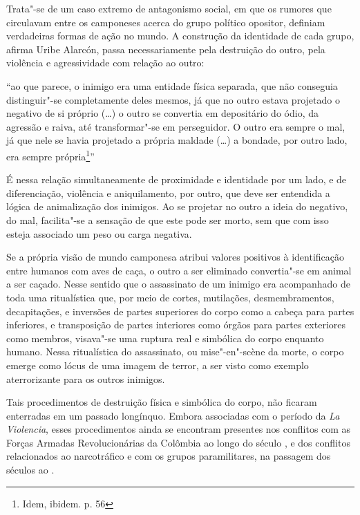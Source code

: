Trata"-se de um caso extremo de antagonismo social, em que os rumores que
circulavam entre os camponeses acerca do grupo político opositor,
definiam verdadeiras formas de ação no mundo. A construção da identidade
de cada grupo, afirma Uribe Alarcón, passa necessariamente pela
destruição do outro, pela violência e agressividade com relação ao
outro:

``ao que parece, o inimigo era uma entidade física separada, que não
conseguia distinguir"-se completamente deles mesmos, já que no outro
estava projetado o negativo de si próprio (\ldots{}) o outro se convertia em
depositário do ódio, da agressão e raiva, até transformar"-se em
perseguidor. O outro era sempre o mal, já que nele se havia projetado a
própria maldade (\ldots{}) a bondade, por outro lado, era sempre
própria\footnote{Idem, ibidem. p. 56}''

É nessa relação simultaneamente de proximidade e identidade por um lado,
e de diferenciação, violência e aniquilamento, por outro, que deve ser
entendida a lógica de animalização dos inimigos. Ao se projetar no outro
a ideia do negativo, do mal, facilita"-se a sensação de que este pode ser
morto, sem que com isso esteja associado um peso ou carga negativa.

Se a própria visão de mundo camponesa atribui valores positivos à
identificação entre humanos com aves de caça, o outro a ser eliminado
convertia"-se em animal a ser caçado. Nesse sentido que o assassinato de
um inimigo era acompanhado de toda uma ritualística que, por meio de
cortes, mutilações, desmembramentos, decapitações, e inversões de partes
superiores do corpo como a cabeça para partes inferiores, e transposição
de partes interiores como órgãos para partes exteriores como membros,
visava"-se uma ruptura real e simbólica do corpo enquanto humano. Nessa
ritualística do assassinato, ou mise"-en"-scène da morte, o corpo emerge
como lócus de uma imagem de terror, a ser visto como exemplo
aterrorizante para os outros inimigos.

Tais procedimentos de destruição física e simbólica do corpo, não
ficaram enterradas em um passado longínquo. Embora associadas com o
período da \emph{La Violencia}, esses procedimentos ainda se encontram
presentes nos conflitos com as Forças Armadas Revolucionárias da
Colômbia ao longo do século , e dos conflitos relacionados ao
narcotráfico e com os grupos paramilitares, na passagem dos séculos 
ao .

\asterisc

